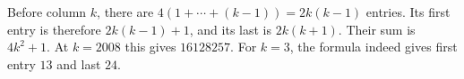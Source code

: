 Before column $k$, there are $4(1+\cdots+(k-1))=2k(k-1)$ entries. Its first entry is therefore $2k(k-1)+1$, and its last is $2k(k+1)$. Their sum is $4k^2+1$. At $k=2008$ this gives $\boxed{16128257}$. For $k=3$, the formula indeed gives first entry $13$ and last $24$.
